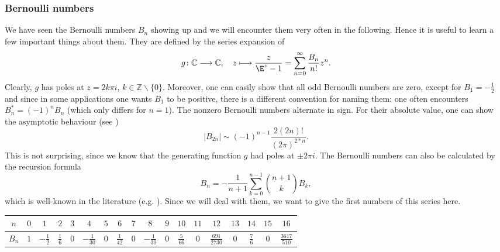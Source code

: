 \subsubsection{Bernoulli numbers}
We have seen the Bernoulli numbers $B_n$ showing up and we will encounter them 
very often in the following. Hence it is useful to learn a few important 
things about them. They are defined by the series expansion of
\begin{equation}
	\label{Alg:DefBernoulli}
	g \colon
	\mathbb{C}
	\longrightarrow
	\mathbb{C}
	, \quad
	z \longmapsto
	\frac{z}{\E^z - 1}
	=
	\sum\limits_{n=0}^{\infty}
	\frac{B_n}{n!}z^n.
\end{equation}
Clearly, $g$ has poles at $z = 2 k \pi i$, $k \in \mathbb{Z}\backslash \{0\}$.
Moreover, one can easily show that all odd Bernoulli numbers are zero, except 
for $B_1 = - \frac{1}{2}$ and since in some applications one wants $B_1$ to be 
positive, there is a different convention for naming them: one often 
encounters $B_n^* = (-1)^n B_n$ (which only differs for $n = 1$). The nonzero 
Bernoulli numbers alternate in sign. For their absolute value, one can show 
the asymptotic behaviour (see \cite{oeis:A027641, oeis:A027642})
\begin{equation*}
	|B_{2n}|
	\sim 
	(-1)^{n-1}
	\frac{2 (2n)!}{(2 \pi)^{2*n}}.
\end{equation*}
This is not surprising, since we know that the generating function $g$ had 
poles at $\pm 2\pi i$. The Bernoulli numbers can also be calculated by the 
recursion formula
\begin{equation}
	\label{Alg:BernoulliRecursive}
	B_n
	=
	- \frac{1}{n + 1}
	\sum\limits_{k = 0}^{n- 1}
	\binom{n + 1}{k}
	B_k,
\end{equation}
which is well-known in the literature (e.g. 
\cite{arakawa.ibukiyama.kaneko:2014a}). Since we will deal with them, 
we want to give the first numbers of this series here.
\begin{center}
	\begin{tabular}
	{c||c|c|c|c|c|c|c|c|c|c|c|c|c|c|c|c|c}
		$n$ & $0$ & $1$ & 
		$2$ & $3$ & $4$ & 
		$5$ & $6$ & $7$ & 
		$8$ & $9$ & $10$ & 
		$11$ & $12$ & $13$ & 
		$14$ & $15$ & $16$
		\\
		\hline 
		$B_n$ & $1$ & $-\frac{1}{2}$ & 
		$\frac{1}{6}$ & $0$ & $-\frac{1}{30}$ & 
		$0$ & $\frac{1}{42}$ & $0$ & 
		$-\frac{1}{30}$ & $0$ & $\frac{5}{66}$ & 
		$0$ & $\frac{691}{2730}$ & $0$ & 
		$\frac{7}{6}$ & $0$ & $\frac{3617}{510}$
	\end{tabular} 
\end{center}



